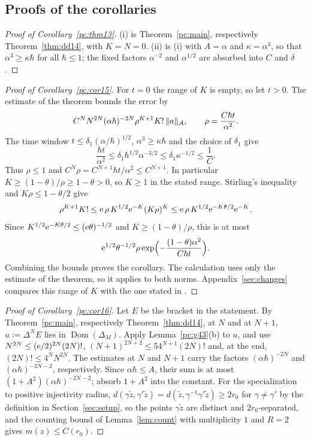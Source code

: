 \subsection{Proofs of the corollaries}\label{subsec:pc-cor}\label{subsec:dd-cor}
\begin{proof}[Proof of Corollary~\ref{pc:thm13}]
(i) is Theorem~\ref{pc:main}, respectively Theorem~\ref{thm:dd14}, with $K=N=0$. (ii) is (i) with $A=\alpha$ and $\kappa=\alpha^3$, so
that $\alpha^3\ge\kappa\hbar$ for all $\hbar\le1$; the fixed factors $\alpha^{-2}$ and $\alpha^{1/2}$ are absorbed into $C$ and $\delta$.
\end{proof}

\begin{proof}[Proof of Corollary~\ref{pc:cor15}]
For $t=0$ the range of $K$ is empty, so let $t>0$. The estimate of the theorem bounds the error by
\[
  C^NN^{2N}(\alpha\hbar)^{-2N}\rho^{K+1}K!\,\lVert a\rVert_{\mathcal A},
  \qquad \rho=\frac{C\hbar t}{\alpha^2}.
\]
The time window $t\le\delta_1(\alpha/\hbar)^{1/2}$, $\alpha^3\ge\kappa\hbar$ and the choice of $\delta_1$ give
\[
  \frac{\hbar t}{\alpha^2}\le\delta_1\hbar^{1/2}\alpha^{-3/2}
  \le\delta_1\kappa^{-1/2}\le\frac1C.
\]
Thus $\rho\le1$ and $C^N\rho=C^{N+1}\hbar t/\alpha^2\le C^{N+1}$. In particular $K\ge(1-\theta)/\rho\ge1-\theta>0$, so $K\ge1$ in
the stated range. Stirling's inequality and $K\rho\le1-\theta/2$ give
\[
  \rho^{K+1}K!
  \le\mathrm{e}\,\rho\,K^{1/2}\mathrm{e}^{-K}(K\rho)^K
  \le\mathrm{e}\,\rho\,K^{1/2}\mathrm{e}^{-K\theta/2}\mathrm{e}^{-K}.
\]
Since $K^{1/2}\mathrm{e}^{-K\theta/2}\le(\mathrm{e}\theta)^{-1/2}$ and
$K\ge(1-\theta)/\rho$, this is at most
\[
  \mathrm{e}^{1/2}\theta^{-1/2}\rho
  \exp\Bigl(-\frac{(1-\theta)\alpha^2}{C\hbar t}\Bigr).
\]
Combining the bounds proves the corollary. The calculation uses only the estimate of the theorem, so it applies to both norms.
Appendix~\ref{sec:changes} compares this range of $K$ with the one stated in \cite{S}.
\end{proof}

\begin{proof}[Proof of Corollary~\ref{pc:cor16}]
Let $E$ be the bracket in the statement. By Theorem~\ref{pc:main}, respectively Theorem~\ref{thm:dd14}, at $N$ and at $N+1$, $u:=\Delta^NE$ lies in $\operatorname{Dom}(\Delta_M)$. Apply
Lemma~\ref{pc:g43}(b) to $u$, and use $N^{2N}\le(\mathrm{e}/2)^{2N}(2N)!$, $(N+1)^{2N+2}\le54^{N+1}(2N)!$ and, at the end,
$(2N)!\le4^NN^{2N}$.
The estimates at $N$ and $N+1$ carry the factors $(\alpha\hbar)^{-2N}$ and
$(\alpha\hbar)^{-2N-2}$, respectively. Since $\alpha\hbar\le A$, their sum is at most
$(1+A^2)(\alpha\hbar)^{-2N-2}$; absorb $1+A^2$ into the constant.
For the specialization to positive injectivity radius, $d(\gamma\tilde z,\gamma'\tilde z)=d(\tilde z,\gamma^{-1}\gamma'\tilde z)\ge2r_0$ for
$\gamma\ne\gamma'$ by the definition in Section~\ref{sec:setup}, so the points $\gamma\tilde z$ are distinct and
$2r_0$-separated, and the counting bound of Lemma~\ref{lem:count} with multiplicity $1$ and $R=2$ gives $m(z)\le C(r_0)$. \qedhere
\end{proof}



